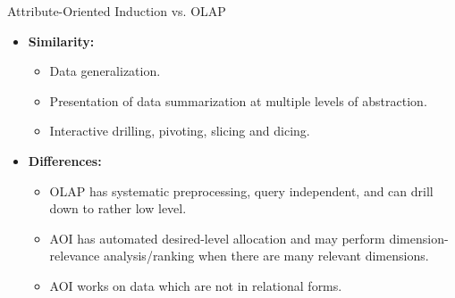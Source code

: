 \begin{frame}{Attribute-Oriented Induction vs. OLAP}
	\begin{itemize}
		\item \textbf{Similarity:}
		      \begin{itemize}
			      \item Data generalization.
			      \item Presentation of data summarization at multiple levels of abstraction.
			      \item Interactive drilling, pivoting, slicing and dicing.
		      \end{itemize}
		\item \textbf{Differences:}
		      \begin{itemize}
			      \item OLAP has systematic preprocessing, query independent, and can drill down to rather low level.
			      \item AOI has automated desired-level allocation and may perform dimension-relevance analysis/ranking when there are many relevant dimensions.
			      \item AOI works on data which are not in relational forms.
		      \end{itemize}
	\end{itemize}
\end{frame}
